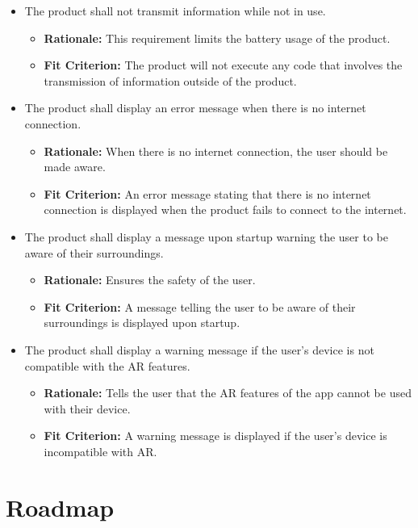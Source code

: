 \documentclass{article}
\begin{document}
\begin{itemize}
    \item The product shall not transmit information while not in use.
    \begin{itemize}
        \item \textbf{Rationale:} This requirement limits the battery usage of the product.
        \item \textbf{Fit Criterion:} The product will not execute any code that involves the transmission of information outside of the product.
    \end{itemize}
    \item The product shall display an error message when there is no internet connection.
    \begin{itemize}
        \item \textbf{Rationale:} When there is no internet connection, the user should be made aware.
        \item \textbf{Fit Criterion:} An error message stating that there is no internet connection is displayed when the product fails to connect to the internet.
    \end{itemize}
    \item The product shall display a message upon startup warning the user to be aware of their surroundings.
    \begin{itemize}
        \item \textbf{Rationale:} Ensures the safety of the user.
        \item \textbf{Fit Criterion:} A message telling the user to be aware of their surroundings is displayed upon startup.
    \end{itemize}
    \item The product shall display a warning message if the user's device is not compatible with the AR features.
    \begin{itemize}
        \item \textbf{Rationale:} Tells the user that the AR features of the app cannot be used with their device.
        \item \textbf{Fit Criterion:} A warning message is displayed if the user's device is incompatible with AR.
    \end{itemize}
\end{itemize}

\section{Roadmap}
\end{document}
